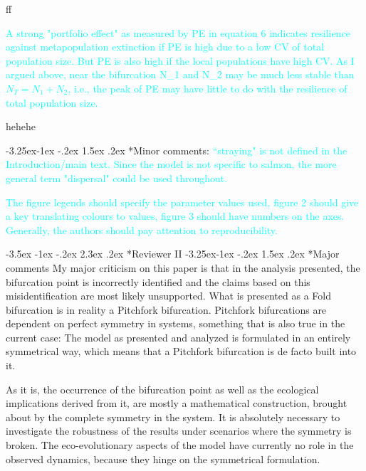 \documentclass[ucm,12pt]{ucletter}
\makeatletter
\newcounter{section}
\newcounter{subsection}[section]
\renewcommand\section{\@startsection {section}{1}{\z@}%
                                   {-3.5ex \@plus -1ex \@minus -.2ex}%
                                   {2.3ex \@plus.2ex}%
                                   {\normalfont\Large\bfseries}}
\newcommand\subsection{\@startsection{subsection}{2}{\z@}%
                                     {-3.25ex\@plus -1ex \@minus -.2ex}%
                                     {1.5ex \@plus .2ex}%
                                     {\normalfont\large\bfseries}}
\makeatother
\begin{document}
\begin{letter}
ff

\textcolor{cyan}{
A strong "portfolio effect" as measured by PE in equation 6 indicates resilience against metapopulation extinction if PE is high due to a low CV of total population size. But PE is also high if the local populations have high CV. As I argued above, near the bifurcation N_1 and N_2 may be much less stable than $N_T=N_1+N_2$, i.e., the peak of PE may have little to do with the resilience of total population size.
}

hehehe

\subsection*{Minor comments:}
\textcolor{cyan}{``straying" is not defined in the Introduction/main text. Since the model is not specific to salmon, the more general term "dispersal" could be used throughout.}

\textcolor{cyan}{The figure legends should specify the parameter values used, figure 2 should give a key translating colours to values, figure 3 should have numbers on the axes. Generally, the authors should pay attention to reproducibility.}






\section*{Reviewer II}
\subsection*{Major comments}
My major criticism on this paper is that in the analysis presented, the bifurcation point is incorrectly identified and the claims based on this misidentification are most likely unsupported. What is presented as a Fold bifurcation is in reality a Pitchfork bifurcation. Pitchfork bifurcations are dependent on perfect symmetry in systems, something that is also true in the current case: The model as presented and analyzed is formulated in an entirely symmetrical way, which means that a Pitchfork bifurcation is de facto built into it.

As it is, the occurrence of the bifurcation point as well as the ecological implications derived from it, are mostly a mathematical construction, brought about by the complete symmetry in the system. It is absolutely necessary to investigate the robustness of the results under scenarios where the symmetry is broken. The eco-evolutionary aspects of the model have currently no role in the observed dynamics, because they hinge on the symmetrical formulation.


\end{letter}
\end{document}
